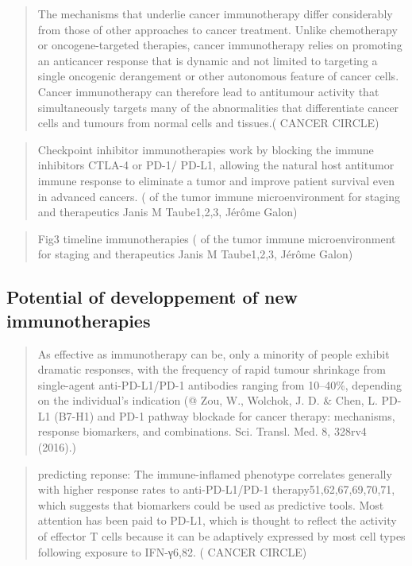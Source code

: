 \documentclass[12pt,]{book}
\theoremstyle{definition}
\theoremstyle{definition}
\theoremstyle{definition}
\theoremstyle{remark}
\begin{document}
\begin{quote}
The mechanisms that underlie cancer immunotherapy differ considerably
from those of other approaches to cancer treatment. Unlike chemotherapy
or oncogene-targeted therapies, cancer immunotherapy relies on promoting
an anticancer response that is dynamic and not limited to targeting a
single oncogenic derangement or other autonomous feature of cancer
cells. Cancer immunotherapy can therefore lead to antitumour activity
that simultaneously targets many of the abnormalities that differentiate
cancer cells and tumours from normal cells and tissues.(\citet{IMMUNE}
CANCER CIRCLE)
\end{quote}

\begin{quote}
Checkpoint inhibitor immunotherapies work by blocking the immune
inhibitors CTLA-4 or PD-1/ PD-L1, allowing the natural host antitumor
immune response to eliminate a tumor and improve patient survival even
in advanced cancers. (\citet{Implications} of the tumor immune
microenvironment for staging and therapeutics Janis M Taube1,2,3, Jérôme
Galon)
\end{quote}

\begin{quote}
Fig3 timeline immunotherapies (\citet{Implications} of the tumor immune
microenvironment for staging and therapeutics Janis M Taube1,2,3, Jérôme
Galon)
\end{quote}

\hypertarget{potential-of-developpement-of-new-immunotherapies}{%
\subsection{Potential of developpement of new
immunotherapies}\label{potential-of-developpement-of-new-immunotherapies}}

\begin{quote}
As effective as immunotherapy can be, only a minority of people exhibit
dramatic responses, with the frequency of rapid tumour shrinkage from
single-agent anti-PD-L1/PD-1 antibodies ranging from 10--40\%, depending
on the individual's indication (@ Zou, W., Wolchok, J. D. \& Chen, L.
PD-L1 (B7-H1) and PD-1 pathway blockade for cancer therapy: mechanisms,
response biomarkers, and combinations. Sci. Transl. Med. 8, 328rv4
(2016).)
\end{quote}

\begin{quote}
predicting reponse: The immune-inflamed phenotype correlates generally
with higher response rates to anti-PD-L1/PD-1 therapy51,62,67,69,70,71,
which suggests that biomarkers could be used as predictive tools. Most
attention has been paid to PD-L1, which is thought to reflect the
activity of effector T cells because it can be adaptively expressed by
most cell types following exposure to IFN-γ6,82. (\citet{IMMUNE} CANCER
CIRCLE)
\end{quote}
\end{document}
